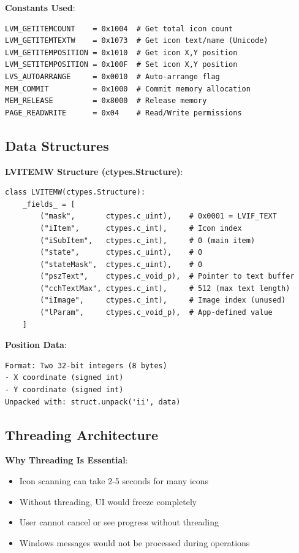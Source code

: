 \documentclass[a4paper,11pt]{article}
\begin{document}
\textbf{Constants Used}:
\begin{verbatim}
LVM_GETITEMCOUNT    = 0x1004  # Get total icon count
LVM_GETITEMTEXTW    = 0x1073  # Get icon text/name (Unicode)
LVM_GETITEMPOSITION = 0x1010  # Get icon X,Y position
LVM_SETITEMPOSITION = 0x100F  # Set icon X,Y position
LVS_AUTOARRANGE     = 0x0010  # Auto-arrange flag
MEM_COMMIT          = 0x1000  # Commit memory allocation
MEM_RELEASE         = 0x8000  # Release memory
PAGE_READWRITE      = 0x04    # Read/Write permissions
\end{verbatim}

\subsection{Data Structures}

\textbf{LVITEMW Structure (ctypes.Structure)}:
\begin{verbatim}
class LVITEMW(ctypes.Structure):
    _fields_ = [
        ("mask",       ctypes.c_uint),    # 0x0001 = LVIF_TEXT
        ("iItem",      ctypes.c_int),     # Icon index
        ("iSubItem",   ctypes.c_int),     # 0 (main item)
        ("state",      ctypes.c_uint),    # 0
        ("stateMask",  ctypes.c_uint),    # 0
        ("pszText",    ctypes.c_void_p),  # Pointer to text buffer
        ("cchTextMax", ctypes.c_int),     # 512 (max text length)
        ("iImage",     ctypes.c_int),     # Image index (unused)
        ("lParam",     ctypes.c_void_p),  # App-defined value
    ]
\end{verbatim}

\textbf{Position Data}:
\begin{verbatim}
Format: Two 32-bit integers (8 bytes)
- X coordinate (signed int)
- Y coordinate (signed int)
Unpacked with: struct.unpack('ii', data)
\end{verbatim}

\subsection{Threading Architecture}

\textbf{Why Threading Is Essential}:
\begin{itemize}
  \item Icon scanning can take 2-5 seconds for many icons
  \item Without threading, UI would freeze completely
  \item User cannot cancel or see progress without threading
  \item Windows messages would not be processed during operations
\end{itemize}
\end{document}
